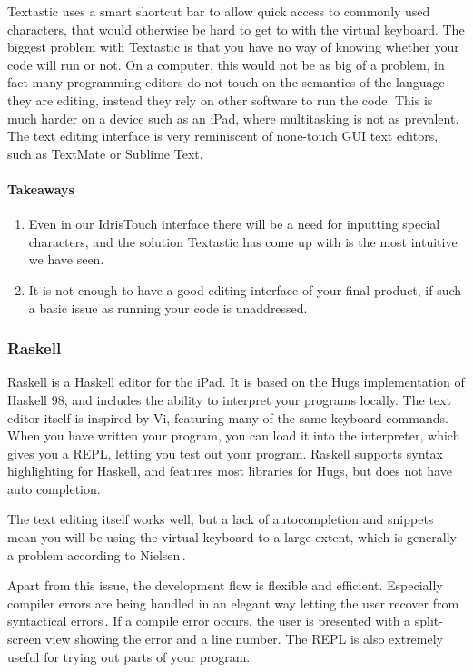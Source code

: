 Textastic uses a smart shortcut bar to allow quick access to commonly used characters, that would otherwise be hard to get to with the virtual keyboard. The biggest problem with Textastic is that you have no way of knowing whether your code will run or not. On a computer, this would not be as big of a problem, in fact many programming editors do not touch on the semantics of the language they are editing, instead they rely on other software to run the code. This is much harder on a device such as an iPad, where multitasking is not as prevalent. The text editing interface is very reminiscent of none-touch GUI text editors, such as TextMate or Sublime Text. 

\paragraph{Takeaways}
\begin{enumerate}
	\item Even in our IdrisTouch interface there will be a need for inputting special characters, and the solution Textastic has come up with is the most intuitive we have seen.
	\item It is not enough to have a good editing interface of your final product, if such a basic issue as running your code is unaddressed.
\end{enumerate}


\subsubsection{Raskell}
\label{subsub:Raskell}
Raskell is a Haskell editor for the iPad. It is based on the Hugs implementation of Haskell 98, and includes the ability to interpret your programs locally. The text editor itself is inspired by Vi, featuring many of the same keyboard commands. When you have written your program, you can load it into the interpreter, which gives you a REPL, letting you test out your program. Raskell supports syntax highlighting for Haskell, and features most libraries for Hugs, but does not have auto completion.

The text editing itself works well, but a lack of autocompletion and snippets mean you will be using the virtual keyboard to a large extent, which is generally a problem according to Nielsen\,\cite[pp. 76]{nielsen2013mobile}. 

Apart from this issue, the development flow is flexible and efficient. Especially compiler errors are being handled in an elegant way letting the user recover from syntactical errors\,\cite{nielsen1990heuristic}. If a compile error occurs, the user is presented with a split-screen view showing the error and a line number. The REPL is also extremely useful for trying out parts of your program.

